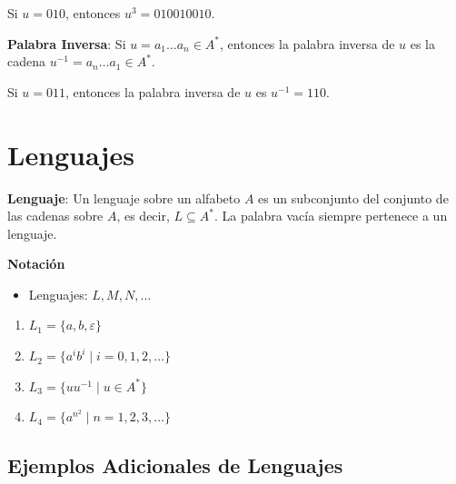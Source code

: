 \documentclass[12pt]{report} %
\begin{document}
\begin{ejemplo}
Si $u = 010$, entonces $u^3 = 010010010$.
\end{ejemplo}

\begin{definicion}
\textbf{Palabra Inversa}: Si $u = a_1 \ldots a_n \in A^*$, entonces la palabra inversa de $u$ es la cadena $u^{-1} = a_n \ldots a_1 \in A^*$.  
\end{definicion}

\begin{ejemplo}
Si $u = 011$, entonces la palabra inversa de $u$ es $u^{-1} = 110$.
\end{ejemplo}

\hypertarget{lenguajes}{%
\section{Lenguajes}\label{lenguajes}}

\begin{definicion}
\textbf{Lenguaje}: Un lenguaje sobre un alfabeto $A$ es un subconjunto del conjunto de las cadenas sobre $A$, es decir, $L \subseteq A^*$.  
La palabra vacía siempre pertenece a un lenguaje.
\end{definicion}

\textbf{Notación}\\

\begin{itemize}
    \item Lenguajes: $L, M, N, \ldots$
\end{itemize}

\begin{ejemplo}
    \begin{enumerate}
        \item $L_1 = \{a, b, \varepsilon\}$  
        \item $L_2 = \{a^i b^i \mid i = 0, 1, 2, \ldots\}$  
        \item $L_3 = \{u u^{-1} \mid u \in A^*\}$  
        \item $L_4 = \{a^{n^2} \mid n = 1, 2, 3, \ldots\}$  
    \end{enumerate}
\end{ejemplo}

\hypertarget{ejemplos-adicionales-de-lenguajes}{%
\subsection{Ejemplos Adicionales de
Lenguajes}\label{ejemplos-adicionales-de-lenguajes}}
\end{document}
